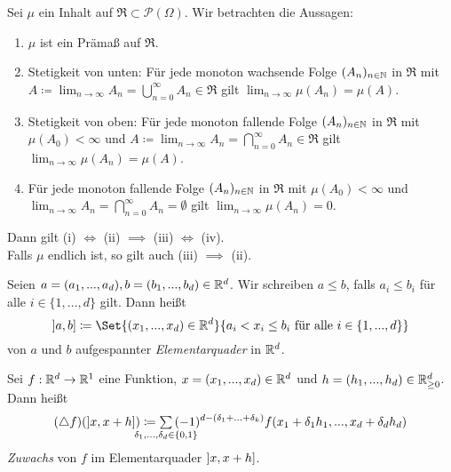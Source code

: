 \documentclass{cheat-sheet}
\newcommand{\Ring}{\mathfrak{R}} %
\begin{document}
\begin{satz}
  Sei $\mu$ ein Inhalt auf $\Ring \subset \mathcal{P}(\Omega)$. Wir betrachten die Aussagen:

  \begin{enumerate}[label=(\roman*),leftmargin=2em]
    \item $\mu$ ist ein Prämaß auf $\Ring$.
    \item Stetigkeit von unten: Für jede monoton wachsende Folge $(A_n)_{n \in \mathbb{N}}$ in $\Ring$ mit $A \coloneqq \lim_{n \to \infty} A_n = \bigcup_{n = 0}^\infty A_n \in \Ring$ gilt $\lim_{n \to \infty} \mu(A_n) = \mu(A)$.
    \item Stetigkeit von oben: Für jede monoton fallende Folge $(A_n)_{n \in \mathbb{N}}$ in $\Ring$ mit $\mu(A_0) < \infty$ und $A \coloneqq \lim_{n \to \infty} A_n = \bigcap_{n = 0}^\infty A_n \in \Ring$ gilt $\lim_{n \to \infty} \mu(A_n) = \mu(A)$.
    \item Für jede monoton fallende Folge $(A_n)_{n \in \mathbb{N}}$ in $\Ring$ mit $\mu(A_0) < \infty$ und $\lim_{n \to \infty} A_n = \bigcap_{n = 0}^\infty A_n = \emptyset$ gilt $\lim_{n \to \infty} \mu(A_n) = 0$.
  \end{enumerate}

  Dann gilt (i) $\iff$ (ii) $\implies$ (iii) $\iff$ (iv).\\
  Falls $\mu$ endlich ist, so gilt auch (iii) $\implies$ (ii).
\end{satz}


\begin{defn}
  Seien $a = (a_1, ..., a_d), b = (b_1, ..., b_d) \in \mathbb{R}^d$. Wir schreiben $a \leq b$, falls $a_i \leq b_i$ für alle $i \in \{ 1, ..., d \}$ gilt. Dann heißt
  \[ \ocinterval{a}{b} \coloneqq \Set{ (x_1, ..., x_d) \in \R^d }{ a_i < x_i \leq b_i \text{ für alle } i \in \{ 1, ..., d \} } \]
  von $a$ und $b$ aufgespannter \emph{Elementarquader} in $\mathbb{R}^d$.
\end{defn}

\begin{defn}
  Sei $f : \mathbb{R}^d \to \mathbb{R}^1$ eine Funktion, $x = (x_1, ..., x_d) \in \mathbb{R}^d$ und $h = (h_1, ..., h_d) \in \mathbb{R}_{\geq 0}^d$. Dann heißt
  \[ (\triangle f)(\ocinterval{x}{x + h}) \coloneqq \sum_{\mathclap{\delta_1, ..., \delta_d \in \{0,1\}}} \, (-1)^{d-(\delta_1 + ... + \delta_k)} f(x_1 + \delta_1 h_1, ..., x_d + \delta_d h_d) \]
  \emph{Zuwachs} von $f$ im Elementarquader $\left] x, x+h \right]$.
\end{defn}
\end{document}
